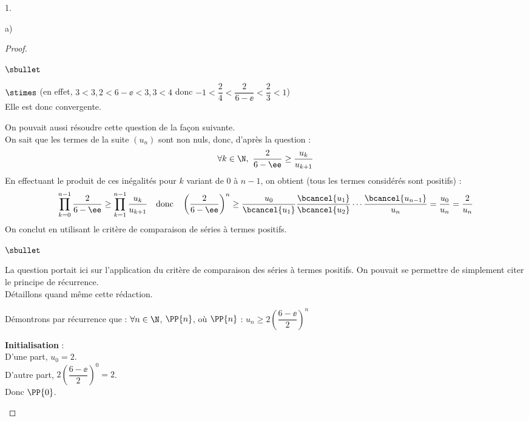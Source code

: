 \begin{noliste}{1.}
\begin{noliste}{a)}
\begin{proof}
\begin{noliste}{$\sbullet$}
\begin{noliste}{$\stimes$}
          (en effet, $3<3,2<6-\ee<3,3<4$ donc
          $-1<\dfrac{2}{4}<\dfrac{2}{6-\ee}<\dfrac{2}{3}<1$)\\
          Elle est donc convergente.
        \end{noliste}
      \end{noliste}
  \begin{remark}%
    On pouvait aussi résoudre cette question de la façon suivante.\\
    On sait que les termes de la suite $(u_n)$ sont non nuls, donc,
    d'après la question  :
    \[
    \forall k \in \N, \ \dfrac{2}{6-\ee}\geq \frac{u_k}{u_{k+1}}
    \]
    En effectuant le produit de ces inégalités pour $k$ variant de $0$
    à $n-1$, on obtient (tous les termes considérés sont positifs) :
    \[
    \prod_{k=0}^{n-1} \frac{2}{6-\ee} \geq \prod_{k=1}^{n-1} 
    \frac{u_k}{u_{k+1}} \quad \mbox{donc} \quad 
    \left(\frac{2}{6-\ee}\right)^n \geq \frac{u_0}{\bcancel{u_1}} 
    \frac{\bcancel{u_1}}{\bcancel{u_2}} \cdots 
    \frac{\bcancel{u_{n-1}}}{u_n}=\frac{u_0}{u_n}=\frac{2}{u_n}
    \]
    On conclut en utilisant le critère de comparaison de séries à 
    termes positifs.
  \end{remark}
  

  \newpage


  \begin{remark}
    \begin{noliste}{$\sbullet$}
    \item La question portait ici sur l'application du critère de
      comparaison des séries à termes positifs. On pouvait se
      permettre de simplement citer le principe de récurrence.\\
      Détaillons quand même cette rédaction.
    \item Démontrons par récurrence que : $\forall n\in\N$, $\PP{n}$,
      \quad où \quad $\PP{n}$ : $u_n\geq 2
      \left(\dfrac{6-\ee}{2}\right)^n$
      \begin{noliste}{\fitem}
      \item {\bf Initialisation} : \\
        D'une part, $u_0=2$.\\
        D'autre part, $2\left(\dfrac{6-\ee}{2}\right)^0=2$.\\
        Donc $\PP{0}$.
        

\end{noliste}
\end{noliste}
\end{remark}
\end{proof}
\end{noliste}
\end{noliste}

